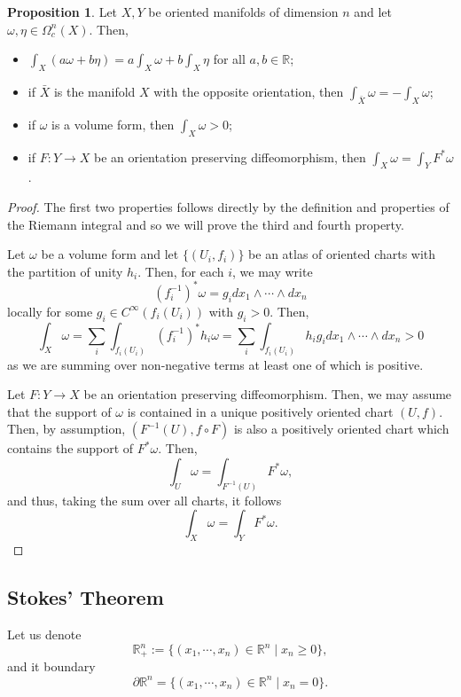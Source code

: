 \documentclass[]{article}
\theoremstyle{definition}
\theoremstyle{definition}
\newtheorem{proposition}{Proposition}[section]
\begin{document}
\begin{proposition}
  Let \(X, Y\) be oriented manifolds of dimension \(n\) and let 
  \(\omega, \eta \in \Omega^n_c(X)\). Then, 
  \begin{itemize}
    \item \(\int_X (a\omega + b\eta) = a\int_X \omega + b\int_X \eta\) for all 
      \(a, b \in \mathbb{R}\);
    \item if \(\bar X\) is the manifold \(X\) with the opposite orientation, then 
      \(\int_{\bar X} \omega = -\int_X \omega\);
    \item if \(\omega\) is a volume form, then \(\int_X \omega > 0\);
    \item if \(F : Y \to X\) be an orientation preserving diffeomorphism, then 
      \(\int_X \omega = \int_Y F^* \omega\).
  \end{itemize}
\end{proposition}
\begin{proof}
  The first two properties follows directly by the definition and properties of 
  the Riemann integral and so we will prove the third and fourth property. 

  Let \(\omega\) be a volume form and let \(\{(U_i, f_i)\}\) be an atlas of 
  oriented charts with the partition of unity \(h_i\). Then, for each \(i\), 
  we may write 
  \[(f_i^{-1})^* \omega = g_i dx_1 \wedge \cdots \wedge dx_n\]
  locally for some \(g_i \in C^\infty(f_i(U_i))\) with \(g_i > 0\). 
  Then, 
  \[\int_X \omega = \sum_i \int_{f_i(U_i)} (f_i^{-1})^* h_i \omega = 
    \sum_i \int_{f_i(U_i)} h_i g_i dx_1 \wedge \cdots \wedge dx_n > 0\]
  as we are summing over non-negative terms at least one of which is positive. 

  Let \(F : Y \to X\) be an orientation preserving diffeomorphism. Then, we may 
  assume that the support of \(\omega\) is contained in a unique positively oriented 
  chart \((U, f)\). Then, by assumption, \((F^{-1}(U), f \circ F)\) is also a 
  positively oriented chart which contains the support of \(F^* \omega\). Then, 
  \[\int_U \omega = \int_{F^{-1}(U)} F^* \omega,\]
  and thus, taking the sum over all charts, it follows 
  \[\int_X \omega = \int_Y F^* \omega.\] 
\end{proof}

\subsection{Stokes' Theorem}

Let us denote 
\[\mathbb{R}^n_+ := \{(x_1, \cdots, x_n) \in \mathbb{R}^n \mid x_n \ge 0\},\]
and it boundary
\[\partial \mathbb{R}^n = \{(x_1, \cdots, x_n) \in \mathbb{R}^n \mid x_n = 0\}.\]
\end{document}
